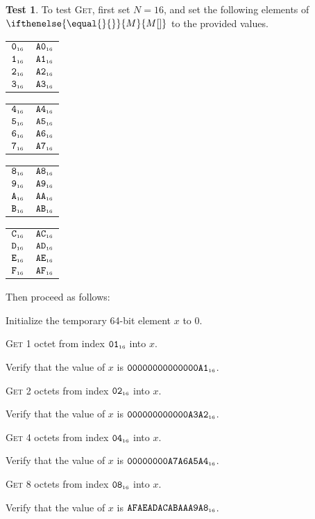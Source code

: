 \documentclass[a4paper,12pt]{article}
\makeatletter
\newcommand{\num}[1]{\texttt{#1}}
\newcommand{\hex}[1]{\num{#1}_{\textup{\tiny 16}}}
\newcommand{\MEM}[1]{\ifthenelse{\equal{#1}{}}{M}{M[#1]}}
\newcommand{\proc}[1]{\textsc{#1}}
\theoremstyle{definition}
\newtheorem{test}{Test}
\newenvironment{memtable}{%
  \begin{trivlist}
    \item
    }{%
    \end{trivlist}}
\newenvironment{memcolumn}{%
  \begin{tabular}{@{}ll@{}}
    \hline}
    {%
    \hline
  \end{tabular}}
\newcommand{\memspace}{\qquad}
\makeatother
\begin{document}
\begin{test}
  To test \proc{Get}, first set $N=16$, and set the following elements of $\MEM{}$ to the provided values.
  \begin{memtable}
    \begin{memcolumn}
      $\hex{0}$ & $\hex{A0}$ \\
      $\hex{1}$ & $\hex{A1}$ \\
      $\hex{2}$ & $\hex{A2}$ \\
      $\hex{3}$ & $\hex{A3}$ \\
    \end{memcolumn}
    \memspace
    \begin{memcolumn}
      $\hex{4}$ & $\hex{A4}$ \\
      $\hex{5}$ & $\hex{A5}$ \\
      $\hex{6}$ & $\hex{A6}$ \\
      $\hex{7}$ & $\hex{A7}$ \\
    \end{memcolumn}
    \memspace
    \begin{memcolumn}
      $\hex{8}$ & $\hex{A8}$ \\
      $\hex{9}$ & $\hex{A9}$ \\
      $\hex{A}$ & $\hex{AA}$ \\
      $\hex{B}$ & $\hex{AB}$ \\
    \end{memcolumn}
    \memspace
    \begin{memcolumn}
      $\hex{C}$ & $\hex{AC}$ \\
      $\hex{D}$ & $\hex{AD}$ \\
      $\hex{E}$ & $\hex{AE}$ \\
      $\hex{F}$ & $\hex{AF}$ \\
    \end{memcolumn}
  \end{memtable}
  Then proceed as follows:
  \begin{stepnumbers}
  \item Initialize the temporary 64-bit element $x$ to $0$.
  \item \proc{Get} 1 octet  from index $\hex{01}$ into $x$.
  \item Verify that the value of $x$ is $\hex{00000000000000A1}$.
  \item \proc{Get} 2 octets from index $\hex{02}$ into $x$.
  \item Verify that the value of $x$ is $\hex{000000000000A3A2}$.
  \item \proc{Get} 4 octets from index $\hex{04}$ into $x$.
  \item Verify that the value of $x$ is $\hex{00000000A7A6A5A4}$.
  \item \proc{Get} 8 octets from index $\hex{08}$ into $x$.
  \item Verify that the value of $x$ is $\hex{AFAEADACABAAA9A8}$.
  \end{stepnumbers}
\end{test}
\end{document}
